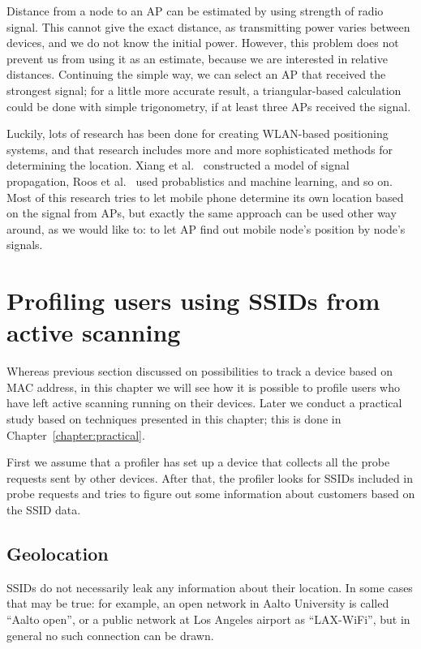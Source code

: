 \documentclass[12pt,a4paper,oneside,pdftex]{report}
\begin{document}
Distance from a node to an AP can be estimated by using strength of radio signal. This cannot give the exact distance, as transmitting power varies between devices, and we do not know the initial power. However, this problem does not prevent us from using it as an estimate, because we are interested in relative distances. Continuing the simple way, we can select an AP that received the strongest signal; for a little more accurate result, a triangular-based calculation could be done with simple trigonometry, if at least three APs received the signal.

Luckily, lots of research has been done for creating WLAN-based positioning systems, and that research includes more and more sophisticated methods for determining the location. Xiang et al.~\cite{xiang2004} constructed a model of signal propagation, Roos et al.~\cite{roos2002} used probablistics and machine learning, and so on. Most of this research tries to let mobile phone determine its own location based on the signal from APs, but exactly the same approach can be used other way around, as we would like to: to let AP find out mobile node's position by node's signals.

\section{Profiling users using SSIDs from active scanning}
\label{sec:ssid_profiling}

Whereas previous section discussed on possibilities to track a device based on MAC address, in this chapter we will see how it is possible to profile users who have left active scanning running on their devices. Later we conduct a practical study based on techniques presented in this chapter; this is done in Chapter~\ref{chapter:practical}. 

First we assume that a profiler has set up a device that collects all the probe requests sent by other devices. After that, the profiler looks for SSIDs included in probe requests and tries to figure out some information about customers based on the SSID data.

\subsection{Geolocation}
\label{subsec:ssid_geo}

SSIDs do not necessarily leak any information about their location. In some cases that may be true: for example, an open network in Aalto University is called ``Aalto open'', or a public network at Los Angeles airport as ``LAX-WiFi'', but in general no such connection can be drawn.
\end{document}
